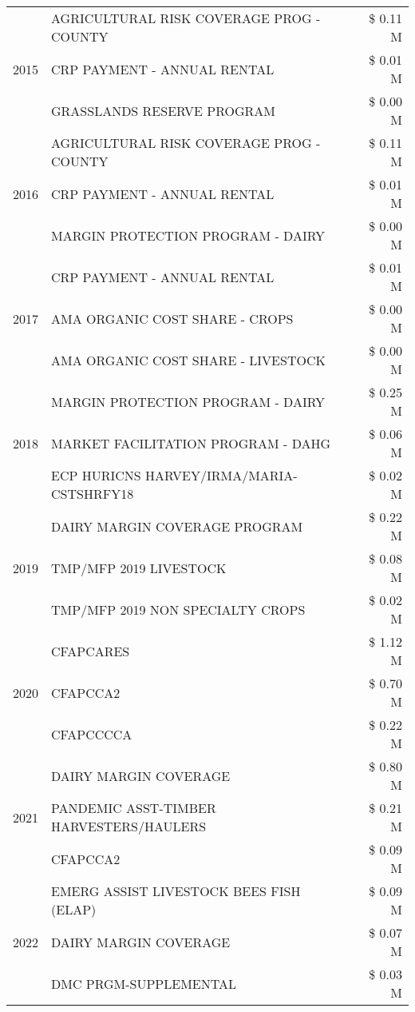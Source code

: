 \begin{tabular}{llr}
\multirow[t]{3}{*}{2015} & AGRICULTURAL RISK COVERAGE PROG - COUNTY & \$ 0.11 M \\
 & CRP PAYMENT - ANNUAL RENTAL & \$ 0.01 M \\
 & GRASSLANDS RESERVE PROGRAM & \$ 0.00 M \\
\cline{1-3}
\multirow[t]{3}{*}{2016} & AGRICULTURAL RISK COVERAGE PROG - COUNTY & \$ 0.11 M \\
 & CRP PAYMENT - ANNUAL RENTAL & \$ 0.01 M \\
 & MARGIN PROTECTION PROGRAM - DAIRY & \$ 0.00 M \\
\cline{1-3}
\multirow[t]{3}{*}{2017} & CRP PAYMENT - ANNUAL RENTAL & \$ 0.01 M \\
 & AMA ORGANIC COST SHARE - CROPS & \$ 0.00 M \\
 & AMA ORGANIC COST SHARE - LIVESTOCK & \$ 0.00 M \\
\cline{1-3}
\multirow[t]{3}{*}{2018} & MARGIN PROTECTION PROGRAM - DAIRY & \$ 0.25 M \\
 & MARKET FACILITATION PROGRAM - DAHG & \$ 0.06 M \\
 & ECP HURICNS HARVEY/IRMA/MARIA-CSTSHRFY18 & \$ 0.02 M \\
\cline{1-3}
\multirow[t]{3}{*}{2019} & DAIRY MARGIN COVERAGE PROGRAM & \$ 0.22 M \\
 & TMP/MFP 2019 LIVESTOCK & \$ 0.08 M \\
 & TMP/MFP 2019 NON SPECIALTY CROPS & \$ 0.02 M \\
\cline{1-3}
\multirow[t]{3}{*}{2020} & CFAPCARES & \$ 1.12 M \\
 & CFAPCCA2 & \$ 0.70 M \\
 & CFAPCCCCA & \$ 0.22 M \\
\cline{1-3}
\multirow[t]{3}{*}{2021} & DAIRY MARGIN COVERAGE & \$ 0.80 M \\
 & PANDEMIC ASST-TIMBER HARVESTERS/HAULERS & \$ 0.21 M \\
 & CFAPCCA2 & \$ 0.09 M \\
\cline{1-3}
\multirow[t]{3}{*}{2022} & EMERG ASSIST LIVESTOCK BEES FISH (ELAP) & \$ 0.09 M \\
 & DAIRY MARGIN COVERAGE & \$ 0.07 M \\
 & DMC PRGM-SUPPLEMENTAL & \$ 0.03 M \\
\cline{1-3}
\bottomrule
\end{tabular}
